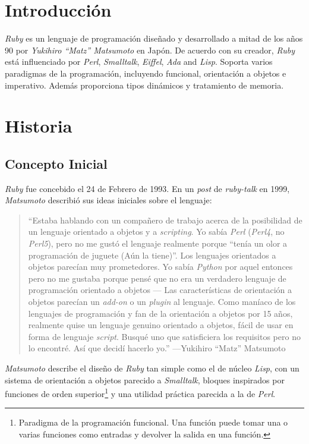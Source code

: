 \section{Introducción}
\textit{Ruby} es un lenguaje de programación diseñado y desarrollado a mitad de los años 90 por \textit{Yukihiro ``Matz'' Matsumoto} en Japón. De acuerdo con su creador, \textit{Ruby} está influenciado por \textit{Perl}, \textit{Smalltalk}, \textit{Eiffel}, \textit{Ada} and \textit{Lisp}.
Soporta varios paradigmas de la programación, incluyendo funcional, orientación a objetos e imperativo. Además proporciona tipos dinámicos y tratamiento de memoria.



\section{Historia}

\subsection{Concepto Inicial}
\textit{Ruby} fue concebido el 24 de Febrero de 1993. En un \textit{post} de \textit{ruby-talk} en 1999, \textit{Matsumoto} describió sus ideas iniciales sobre el lenguaje:

\begin{quotation}\small\noindent 
``Estaba hablando con un compañero de trabajo acerca de la posibilidad de un lenguaje orientado a objetos y a \textit{scripting}.  Yo sabía \textit{Perl} (\textit{Perl4}, no \textit{Perl5}), pero no me gustó el lenguaje realmente porque ``tenía un olor a programación de juguete (Aún la tiene)''. Los lenguajes orientados a objetos parecían muy prometedores. Yo sabía \textit{Python} por aquel entonces pero no me gustaba porque pensé que no era un verdadero lenguaje de programación orientado a objetos — Las características de orientación a objetos parecían un \textit{add-on} o un \textit{plugin} al lenguaje. Como maníaco de los lenguajes de programación y fan de la orientación a objetos por 15 años, realmente quise un lenguaje genuino orientado a objetos, fácil de usar en forma de lenguaje \textit{script}. Busqué uno que satisficiera los requisitos pero no lo encontré. Así que decidí hacerlo yo.'' ---Yukihiro ``Matz'' Matsumoto \cite{Matsumoto1999}
\end{quotation}

\textit{Matsumoto} describe el diseño de \textit{Ruby} tan simple como el de núcleo \textit{Lisp}, con un sistema de orientación a objetos parecido a \textit{Smalltalk}, bloques inspirados por funciones de orden superior\footnote{Paradigma de la programación funcional. Una función puede tomar una o varias funciones como entradas y devolver la salida en una función.} y una utilidad práctica parecida a la de \textit{Perl}.


